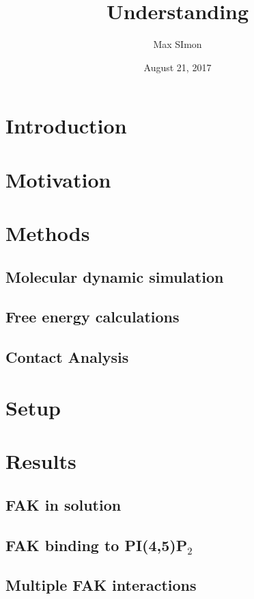 \documentclass[
11pt, %
parskip=half, %
digital, %
oneside, %
]{bsc}
\title{Understanding}
\author{Max SImon}
\date{August 21, 2017}
\newcommand{\pip}{PI(4,5)P$_2$}
\begin{document}
	
\chapter{Introduction}

\chapter{Motivation}

\chapter{Methods}
\section{Molecular dynamic simulation}

\section{Free energy calculations}

\section{Contact Analysis}

\chapter{Setup}

\chapter{Results}
\section{FAK in solution}
\label{sec:fak_sol}

\section{FAK binding to \pip{}}



\section{Multiple FAK interactions}

\end{document}
